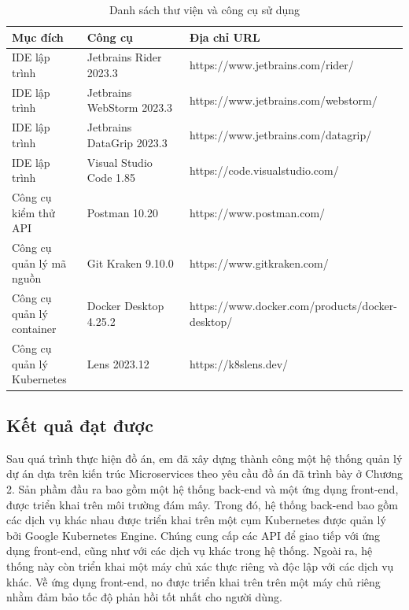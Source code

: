 \documentclass[../DoAn.tex]{subfiles}
\begin{document}
\begin{table}[H]
    \renewcommand{\arraystretch}{1.2}
    \centering{}
    \begin{tabular}{p{0.2\linewidth}p{0.3\linewidth}p{0.5\linewidth}}
        \hline
        \textbf{Mục đích}          & \textbf{Công cụ}          & \textbf{Địa chỉ URL}                            \\ \hline
        IDE lập trình              & Jetbrains Rider 2023.3    & https://www.jetbrains.com/rider/                \\ \hline
        IDE lập trình              & Jetbrains WebStorm 2023.3 & https://www.jetbrains.com/webstorm/             \\ \hline
        IDE lập trình              & Jetbrains DataGrip 2023.3 & https://www.jetbrains.com/datagrip/             \\ \hline
        IDE lập trình              & Visual Studio Code 1.85   & https://code.visualstudio.com/                  \\ \hline
        Công cụ kiểm thử API       & Postman 10.20             & https://www.postman.com/                        \\ \hline
        Công cụ quản lý mã nguồn   & Git Kraken 9.10.0         & https://www.gitkraken.com/                      \\ \hline
        Công cụ quản lý container  & Docker Desktop 4.25.2     & https://www.docker.com/products/docker-desktop/ \\ \hline
        Công cụ quản lý Kubernetes & Lens 2023.12              & https://k8slens.dev/                            \\ \hline
    \end{tabular}
    \renewcommand{\arraystretch}{1}
    \caption{Danh sách thư viện và công cụ sử dụng}
    \label{fig:libaries_and_tools}
\end{table}

\newpage

\subsection{Kết quả đạt được}
\label{subsection:4.3.2}

Sau quá trình thực hiện đồ án, em đã xây dựng thành công một hệ thống quản lý dự án dựa trên kiến trúc Microservices theo yêu cầu đồ án
đã trình bày ở Chương 2. Sản phầm đầu ra bao gồm một hệ thống back-end và một ứng dụng front-end, được triển khai trên môi trường đám mây.
Trong đó, hệ thống back-end bao gồm các dịch vụ khác nhau được triển khai trên một cụm Kubernetes được quản lý bởi Google Kubernetes Engine.
Chúng cung cấp các API để giao tiếp với ứng dụng front-end, cũng như với các dịch vụ khác trong hệ thống. Ngoài ra, hệ thống này còn triển khai một
máy chủ xác thực riêng và độc lập với các dịch vụ khác.
Về ứng dụng front-end, no được triển khai trên trên một máy chủ riêng nhằm đảm bảo tốc độ phản hồi tốt nhất cho người dùng.
\end{document}
